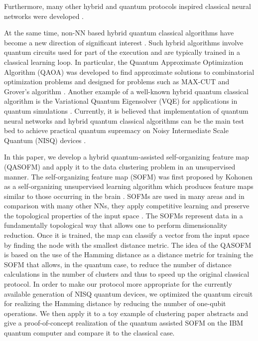 \documentclass[%
  pra, aps, physrev,
  showkeys,
  twocolumn,
  showpacs,
  superscriptaddress,
  amsmath,amssymb,
  10pt
]{revtex4-2}
\begin{document}
Furthermore, many other hybrid and quantum protocols inspired classical neural networks were developed  \cite{kolleQuantumDenoisingDiffusion2024,li2019, Heese2022,killoran2019,bondarenko2019,dunjko2017,nautrup2019,foesel2018, rebentrost2018,purushothaman1997,verdon2019,cherny2019,byrnes2013,mishra2019, pyrkov2019, vinci2019, lu2019,mohseni2023deep,mohseni2024deep}.

At the same time, non-NN based hybrid quantum classical algorithms have become a new direction of significant interest \cite{mcclean2016,arute2020,akshay2020}.
Such hybrid algorithms involve quantum circuits used for part of the execution and are typically trained in a classical learning loop.
In particular, the Quantum Approximate Optimization Algorithm (QAOA) was developed to find approximate solutions to combinatorial optimization problems \cite{farhi2014,farhi2016}
and designed for problems such as MAX-CUT and Grover's algorithm \cite{arute2020,akshay2020,wang2018,jiang2017,huang2019,wecker2016,pagano2019,byrnes2018,liao2021quadratic}.
Another example of a well-known hybrid quantum classical algorithm is the Variational Quantum Eigensolver (VQE) for applications in quantum simulations
\cite{kandala2017,aspuru-guzik2005,lanyon2010,peruzzo2014}.
Currently, it is believed that implementation of quantum neural networks and hybrid quantum classical algorithms can be the main test bed to achieve practical quantum supremacy on Noisy Intermediate Scale Quantum (NISQ) devices \cite{preskill2018,Bharti2022,Cerezo2021}.

In this paper, we develop a hybrid quantum-assisted self-organizing feature map (QASOFM)
and apply it to the data clustering problem in an unsupervised manner. The self-organizing feature map (SOFM) was first proposed by Kohonen \cite{kohonen1990,kohonen1996,kohonen1997} as a self-organizing unsupervised learning algorithm which produces feature maps similar to those occurring in the brain \cite{solan2001}. SOFMs are used in many areas \cite{vilibic2016, guido1998, doszkocs1990, jones2012,mori2019,corsello2017,zhu2018,chea2016}
and in comparison with many other NNs, they apply competitive learning and preserve the topological properties of the input space \cite{kiviluotoa1996}.
The SOFMs represent data in a fundamentally topological way that allows one to perform dimensionality reduction.
Once it is trained, the map can classify a vector from the input space by finding the node with the smallest distance metric. The idea of the QASOFM is based on the use of the Hamming distance as a distance metric for training the SOFM that allows, in the quantum case, to reduce the number of distance calculations in the number of clusters and thus to speed up the original classical protocol.
In order to make our protocol more appropriate for the currently available generation of NISQ quantum devices, we optimized the quantum circuit for realizing the Hamming distance by reducing the number of one-qubit operations. We then apply it to a toy example of clustering paper abstracts and give a proof-of-concept realization of the quantum assisted SOFM on the IBM quantum computer \cite{ibmq}
and compare it to the classical case.
\end{document}
